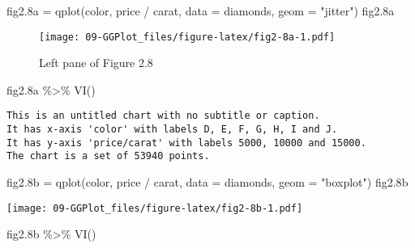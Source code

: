 \documentclass[
]{book}
\newenvironment{Shaded}{\begin{snugshade}}{\end{snugshade}}
\newcommand{\AttributeTok}[1]{\textcolor[rgb]{0.77,0.63,0.00}{#1}}
\newcommand{\FloatTok}[1]{\textcolor[rgb]{0.00,0.00,0.81}{#1}}
\newcommand{\FunctionTok}[1]{\textcolor[rgb]{0.00,0.00,0.00}{#1}}
\newcommand{\NormalTok}[1]{#1}
\newcommand{\OtherTok}[1]{\textcolor[rgb]{0.56,0.35,0.01}{#1}}
\newcommand{\SpecialCharTok}[1]{\textcolor[rgb]{0.00,0.00,0.00}{#1}}
\newcommand{\StringTok}[1]{\textcolor[rgb]{0.31,0.60,0.02}{#1}}
\begin{document}
\begin{Shaded}
\begin{Highlighting}[]
\NormalTok{fig2}\FloatTok{.8}\NormalTok{a  }\OtherTok{=} \FunctionTok{qplot}\NormalTok{(color, price }\SpecialCharTok{/}\NormalTok{ carat, }\AttributeTok{data =}\NormalTok{ diamonds, }\AttributeTok{geom =} \StringTok{"jitter"}\NormalTok{)}
\NormalTok{fig2}\FloatTok{.8}\NormalTok{a}
\end{Highlighting}
\end{Shaded}

\begin{figure}
\centering
\texttt{[image: 09-GGPlot\_files/figure-latex/fig2-8a-1.pdf]}
\caption{\label{fig:fig2-8a}Left pane of Figure 2.8}
\end{figure}

\begin{Shaded}
\begin{Highlighting}[]
\NormalTok{fig2}\FloatTok{.8}\NormalTok{a }\SpecialCharTok{\%\textgreater{}\%} \FunctionTok{VI}\NormalTok{()   }
\end{Highlighting}
\end{Shaded}

\begin{verbatim}
This is an untitled chart with no subtitle or caption.
It has x-axis 'color' with labels D, E, F, G, H, I and J.
It has y-axis 'price/carat' with labels 5000, 10000 and 15000.
The chart is a set of 53940 points.
\end{verbatim}

\begin{Shaded}
\begin{Highlighting}[]
\NormalTok{fig2}\FloatTok{.8}\NormalTok{b }\OtherTok{=} \FunctionTok{qplot}\NormalTok{(color, price }\SpecialCharTok{/}\NormalTok{ carat, }\AttributeTok{data =}\NormalTok{ diamonds, }\AttributeTok{geom =} \StringTok{"boxplot"}\NormalTok{)    }
\NormalTok{fig2}\FloatTok{.8}\NormalTok{b}
\end{Highlighting}
\end{Shaded}

\texttt{[image: 09-GGPlot\_files/figure-latex/fig2-8b-1.pdf]}

\begin{Shaded}
\begin{Highlighting}[]
\NormalTok{fig2}\FloatTok{.8}\NormalTok{b }\SpecialCharTok{\%\textgreater{}\%} \FunctionTok{VI}\NormalTok{()   }
\end{Highlighting}
\end{Shaded}
\end{document}
